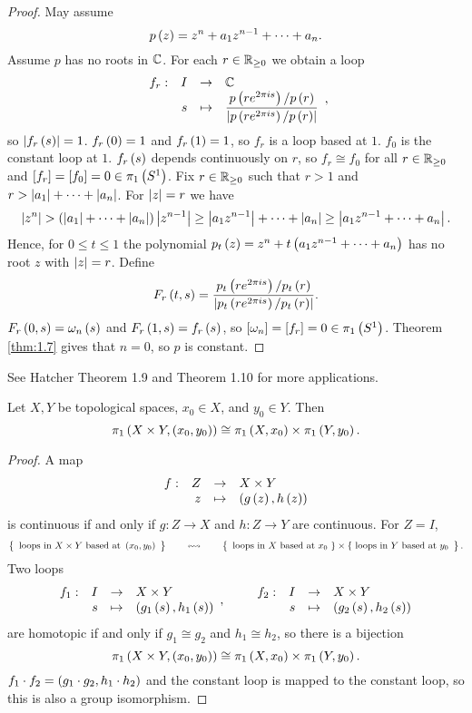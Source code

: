 \begin{proof}
May assume
$$ p\left( z \right) = z^n + a_1z^{n - 1} + \dots + a_n. $$
Assume $ p $ has no roots in $ \mathbb{C} $. For each $ r \in \mathbb{R}_{\ge 0} $ we obtain a loop
$$ \function[f_r]{I}{\C}{s}{\dfrac{p\rb{re^{2\pi is}} / p\rb{r}}{\abs{p\rb{re^{2\pi is}} / p\rb{r}}}}, $$
so $ \left\lvert f_r\left( s \right) \right\rvert = 1 $. $ f_r\left( 0 \right) = 1 $ and $ f_r\left( 1 \right) = 1 $, so $ f_r $ is a loop based at $ 1 $. $ f_0 $ is the constant loop at $ 1 $. $ f_r\left( s \right) $ depends continuously on $ r $, so $ f_r \cong f_0 $ for all $ r \in \mathbb{R}_{\ge 0} $ and $ \left[ f_r \right] = \left[ f_0 \right] = 0 \in \pi_1\left( S^1 \right) $. Fix $ r \in \mathbb{R}_{\ge 0} $ such that $ r > 1 $ and $ r > \left\lvert a_1 \right\rvert + \dots + \left\lvert a_n \right\rvert $. For $ \left\lvert z \right\rvert = r $ we have
$$ \left\lvert z^n \right\rvert > \left( \left\lvert a_1 \right\rvert + \dots + \left\lvert a_n \right\rvert \right)\left\lvert z^{n - 1} \right\rvert \ge \left\lvert a_1z^{n - 1} \right\rvert + \dots + \left\lvert a_n \right\rvert \ge \left\lvert a_1z^{n - 1} + \dots + a_n \right\rvert. $$
Hence, for $ 0 \le t \le 1 $ the polynomial $ p_t\left( z \right) = z^n + t\left( a_1z^{n - 1} + \dots + a_n \right) $ has no root $ z $ with $ \left\lvert z \right\rvert = r $. Define
$$ F_r\left( t, s \right) = \dfrac{p_t\left( re^{2\pi is} \right) / p_t\left( r \right)}{\left\lvert p_t\left( re^{2\pi is} \right) / p_t\left( r \right) \right\rvert}. $$
$ F_r\left( 0, s \right) = \omega_n\left( s \right) $ and $ F_r\left( 1, s \right) = f_r\left( s \right) $, so $ \left[ \omega_n \right] = \left[ f_r \right] = 0 \in \pi_1\left( S^1 \right) $. Theorem \ref{thm:1.7} gives that $ n = 0 $, so $ p $ is constant.
\end{proof}

See Hatcher Theorem 1.9 and Theorem 1.10 for more applications.

\begin{proposition}
Let $ X, Y $ be topological spaces, $ x_0 \in X $, and $ y_0 \in Y $. Then
$$ \pi_1\left( X \times Y, \left( x_0, y_0 \right) \right) \cong \pi_1\left( X, x_0 \right) \times \pi_1\left( Y, y_0 \right). $$
\end{proposition}

\begin{proof}
A map
$$ \function[f]{Z}{X \times Y}{z}{\rb{g\rb{z}, h\rb{z}}} $$
is continuous if and only if $ g : Z \to X $ and $ h : Z \to Y $ are continuous. For $ Z = I $,
$$ \correspondence{\text{loops in} \ X \times Y \ \text{based at} \ \rb{x_0, y_0}}{\text{loops in} \ X \ \text{based at} \ x_0 \ \} \times \{ \ \text{loops in} \ Y \ \text{based at} \ y_0}. $$
Two loops
$$ \function[f_1]{I}{X \times Y}{s}{\rb{g_1\rb{s}, h_1\rb{s}}}, \qquad \function[f_2]{I}{X \times Y}{s}{\rb{g_2\rb{s}, h_2\rb{s}}} $$
are homotopic if and only if $ g_1 \cong g_2 $ and $ h_1 \cong h_2 $, so there is a bijection
$$ \pi_1\left( X \times Y, \left( x_0, y_0 \right) \right) \cong \pi_1\left( X, x_0 \right) \times \pi_1\left( Y, y_0 \right). $$
$ f_1 \cdot f_2 = \left( g_1 \cdot g_2, h_1 \cdot h_2 \right) $ and the constant loop is mapped to the constant loop, so this is also a group isomorphism.
\end{proof}

